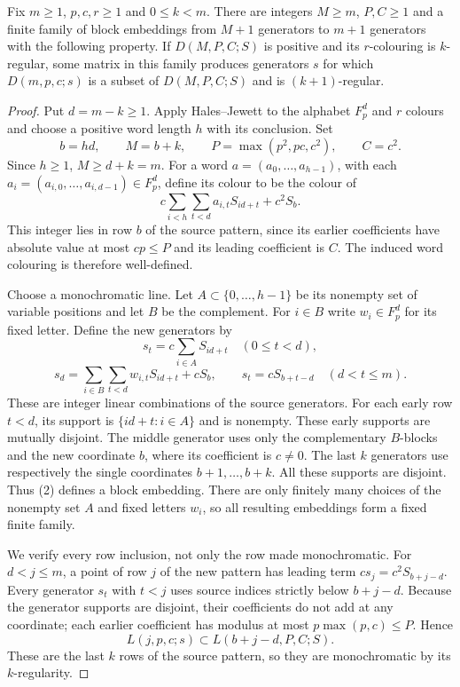 \begin{lemma}
\label{qr:one-step}
\leanok
{}
Fix $m\geq1$, $p,c,r\geq1$ and $0\leq k<m$.
There are integers $M\geq m$, $P,C\geq1$ and a finite family of block
embeddings from $M+1$ generators to $m+1$ generators with the following
property.  If $D(M,P,C;S)$ is positive and its $r$-colouring is $k$-regular,
some matrix in this family produces generators $s$ for which
$D(m,p,c;s)$ is a subset of $D(M,P,C;S)$ and is $(k+1)$-regular.
\end{lemma}
\begin{proof}
Put $d=m-k\geq1$.  Apply Hales--Jewett to the alphabet $F_p^d$ and $r$
colours and choose a positive word length $h$ with its conclusion.
Set
\[
 b=hd,\qquad M=b+k,\qquad
 P=\max(p^2,pc,c^2),\qquad C=c^2.
\]
Since $h\geq1$, $M\geq d+k=m$.
For a word $a=(a_0,\ldots,a_{h-1})$, with each
$a_i=(a_{i,0},\ldots,a_{i,d-1})\in F_p^d$, define its colour to be the
colour of
\[
 c\sum_{i<h}\sum_{t<d}a_{i,t}S_{id+t}+c^2S_b.                 \tag{1}
\]
This integer lies in row $b$ of the source pattern, since its earlier
coefficients have absolute value at most $cp\leq P$ and its leading
coefficient is $C$.  The induced word colouring is therefore well-defined.

Choose a monochromatic line.  Let $A\subset\{0,\ldots,h-1\}$ be its
nonempty set of variable positions and let $B$ be the complement.
For $i\in B$ write $w_i\in F_p^d$ for its fixed letter.
Define the new generators by
\[
 s_t=c\sum_{i\in A}S_{id+t}\quad(0\leq t<d),
\]
\[
 s_d=\sum_{i\in B}\sum_{t<d}w_{i,t}S_{id+t}+cS_b,
 \qquad
 s_t=cS_{b+t-d}\quad(d<t\leq m).                            \tag{2}
\]
These are integer linear combinations of the source generators.
For each early row $t<d$, its support is
$\{id+t:i\in A\}$ and is nonempty.  These early supports are mutually
disjoint.  The middle generator uses only the complementary $B$-blocks
and the new coordinate $b$, where its coefficient is $c\ne0$.
The last $k$ generators use respectively the single coordinates
$b+1,\ldots,b+k$.  All these supports are disjoint.
Thus (2) defines a block embedding.  There are only finitely many choices
of the nonempty set $A$ and fixed letters $w_i$, so all resulting
embeddings form a fixed finite family.

We verify every row inclusion, not only the row made monochromatic.
For $d<j\leq m$, a point of row $j$ of the new pattern has leading term
$cs_j=c^2S_{b+j-d}$.
Every generator $s_t$ with $t<j$ uses source indices strictly below
$b+j-d$.  Because the generator supports are disjoint, their coefficients
do not add at any coordinate; each earlier coefficient has modulus at
most $p\max(p,c)\leq P$.
Hence
\[
 L(j,p,c;s)\subset L(b+j-d,P,C;S).                           \tag{3}
\]
These are the last $k$ rows of the source pattern, so they are
monochromatic by its $k$-regularity.


\end{proof}
